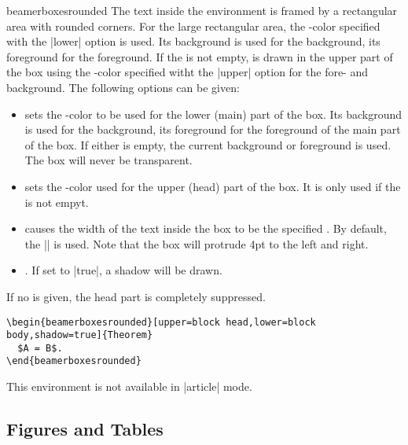 \begin{environment}{{beamerboxesrounded}}
  The text inside the environment is framed by a rectangular area with
  rounded corners. For the large rectangular area, the \beamer-color
  specified with the |lower| option  is used. Its background is used
  for the background, its foreground for the foreground. If the
   is not empty,  is drawn in the 
  upper part of the box using the \beamer-color specified witht the
  |upper| option for the fore- and background. The following options
  can be given: 
  \begin{itemize}
  \item {} sets the \beamer-color
    to be used for the lower (main) part of the box. Its background is
    used for the background, its foreground for the foreground of the
    main part of the box. If either is empty, the current background
    or foreground is used. The box will never be transparent.
  \item {} sets the \beamer-color
    used for the upper (head) part of the box. It is only used if the
     is not empyt.     
  \item {} causes the width of the
    text inside the box to be the specified . By
    default, the |\textwidth| is used. Note that the box will protrude
    4pt to the left and right.
  \item {}. If set to |true|, a
    shadow will be drawn.    
  \end{itemize}
  If no  is given, the head part is completely suppressed.
  \example
\begin{verbatim}
\begin{beamerboxesrounded}[upper=block head,lower=block body,shadow=true]{Theorem}
  $A = B$.
\end{beamerboxesrounded}
\end{verbatim}

  \articlenote
  This environment is not available in |article| mode.
\end{environment}





\subsection{Figures and Tables}

